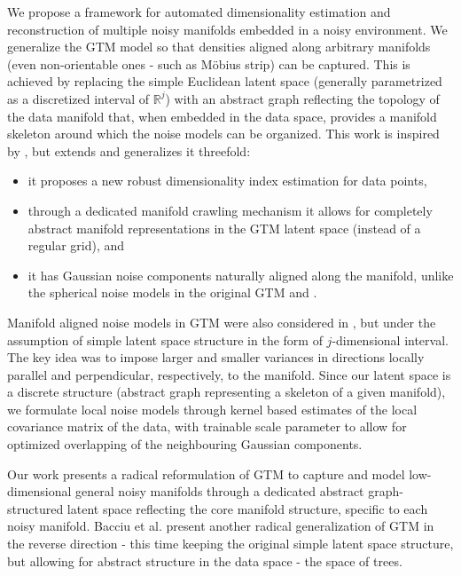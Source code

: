 We propose a framework for automated dimensionality estimation and reconstruction of multiple noisy manifolds embedded in a noisy environment. We generalize the GTM model so that densities aligned along arbitrary manifolds (even non-orientable ones - such as M\"{o}bius strip) can be captured.
This is achieved by replacing the simple Euclidean latent space (generally parametrized as a discretized interval of $\mathbb{R}^j$) with an abstract graph reflecting the topology of the data manifold that, when embedded in the data space, provides a manifold skeleton around which the noise models can be organized.
This work is inspired by \cite{10.1007/978-3-540-87481-2_37}, but extends and generalizes it threefold: 
\begin{itemize}
 \item it proposes a new robust dimensionality index estimation for data points,
 \item through a dedicated manifold crawling mechanism it allows for completely abstract manifold representations in the GTM latent space (instead of a regular grid), and
 \item it has Gaussian noise components naturally aligned along the manifold, unlike the spherical noise models in the original GTM and \cite{10.1007/978-3-540-87481-2_37}.
\end{itemize}
Manifold aligned noise models in GTM were also considered in 
\cite{Bishop1998DevelopmentsOT},
but under the assumption of simple latent space structure in the form of $j$-dimensional interval. The key idea was to impose larger and smaller variances in directions locally parallel and perpendicular, respectively, to the manifold. Since our latent space is a discrete structure (abstract graph representing a skeleton of a given manifold), we formulate local noise models through kernel based estimates of the local covariance matrix of the data, with trainable scale parameter to allow for optimized overlapping of the neighbouring Gaussian components. 

Our work presents a radical reformulation of GTM to capture and model low-dimensional general noisy manifolds through a dedicated abstract graph-structured latent space reflecting the core manifold structure, specific to each noisy manifold. Bacciu et al. \cite{Bacciu13} present another radical generalization of GTM in the reverse direction - this time keeping the original simple latent space structure, but allowing for abstract structure in the data space - the space of trees.

